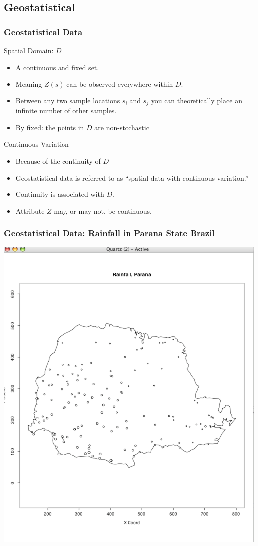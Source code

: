 \documentclass[nototal]{beamer}
\begin{document}
\subsection{Geostatistical}
\begin{frame}[<+->]
  \frametitle{Geostatistical Data}
  \begin{block}{Spatial Domain: $D$ }
    \begin{itemize}
      \item A continuous and fixed set.
      \item Meaning $Z(s)$ can be observed everywhere within $D$.
      \item Between any two sample locations $s_i$ and $s_j$ you can
	theoretically place an infinite number of other samples.
      \item By fixed: the points in $D$ are non-stochastic
    \end{itemize}
   \end{block}
\begin{block}{Continuous Variation}
    \begin{itemize}
      \item Because of the continuity of $D$
      \item Geostatistical data is referred to as ``spatial data with
	continuous variation.''
      \item Continuity is associated with $D$.
      \item Attribute $Z$ may, or may not, be continuous.
    \end{itemize}
   \end{block}
 \end{frame}
 \begin{frame}
   \frametitle{Geostatistical Data: Rainfall in Parana State Brazil}
   \begin{center}
     \includegraphics[width=.65\linewidth]{rainfall.pdf}
   \end{center}
 \end{frame}
\end{document}
